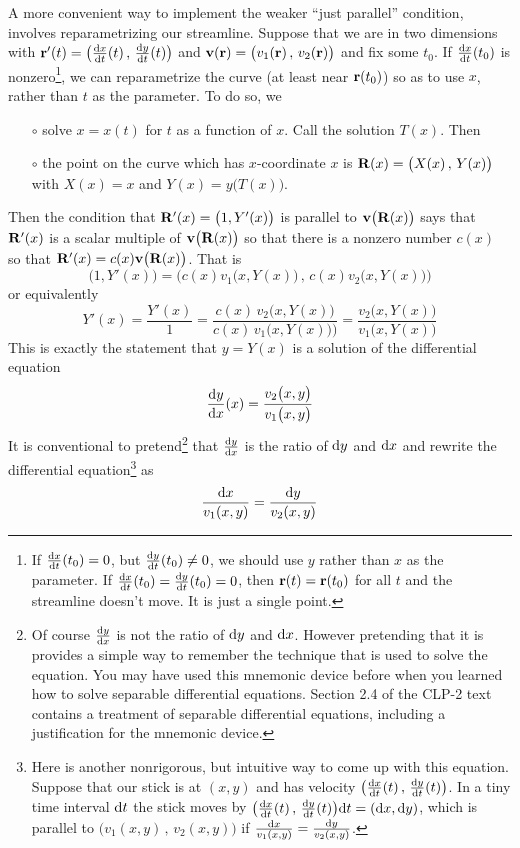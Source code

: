 A more convenient way to implement the weaker ``just parallel'' 
condition, involves reparametrizing our streamline. 
Suppose that we are in two dimensions 
with $\vr'(t)=\big(\diff{x}{t}(t)\,,\,\diff{y}{t}(t)\big)$ and
$\mathbf{v}(\mathbf{r})=\big(v_1(\mathbf{r})\,,\,v_2(\mathbf{r})\big)$  and fix some $t_0$. If $\diff{x}{t}(t_0)$ is 
nonzero\footnote{If $\diff{x}{t}(t_0)=0$,
but $\diff{y}{t}(t_0)\ne 0$, we should use $y$ rather than $x$ as the 
parameter. If $\diff{x}{t}(t_0)=\diff{y}{t}(t_0)=0$, then $\mathbf{r}(t)=\mathbf{r}(t_0)$
for all $t$ and the streamline doesn't move. It is just a single point.}, 
we can reparametrize the curve (at least near $\mathbf{r}(t_0)$) so as to use $x$, rather than $t$ as the parameter. To do so, we
\begin{itemize}\itemsep1pt \parskip0pt  %
\item[$\circ$] solve $x=x(t)$ for $t$ as a function of $x$. Call 
the solution $T(x)$. Then
\item[$\circ$] the point on the curve which has $x$-coordinate $x$ is 
$\mathbf{R}(x)=\big(X(x)\,,\,Y(x)\big)$ with $X(x)=x$ and $Y(x) = y\big(T(x)\big)$. 
\end{itemize}
Then the condition that $\mathbf{R}'(x)=\big(1,Y'(x)\big)$ is parallel to $\mathbf{v}\big(\mathbf{R}(x)\big)$ says that $\mathbf{R}'(x)$ is a scalar multiple of
$\mathbf{v}\big(\mathbf{R}(x)\big)$ so that 
there is a nonzero number $c(x)$ so that $\mathbf{R}'(x)=c(x) \mathbf{v}\big(\mathbf{R}(x)\big)$. That is
\begin{equation*}
\big(1,Y'(x)\big) 
   =\big( c(x)v_1\big(x,Y(x)\big)\,,\, c(x)v_2\big(x,Y(x)\big)  \big)
\end{equation*}
or equivalently
\begin{equation*}
Y'(x)=\frac{Y'(x)}{1}
=\frac{c(x)\,v_2\big(x,Y(x)\big)}{c(x)\,v_1\big(x,Y(x)\big)\big)}
=\frac{v_2\big(x,Y(x)\big)}{v_1\big(x,Y(x)\big)}
\end{equation*}
This is exactly the statement that $y=Y(x)$ is a solution of the differential equation
\begin{equation*}
\diff{y}{x}(x) = \frac{v_2\big(x,y\big)}{v_1\big(x,y\big)}
\end{equation*}
It is conventional to pretend\footnote{Of course $\diff{y}{x}$ is not the ratio of $\mathrm{d}y$ and $\mathrm{d}x$. However pretending that it is provides a simple
way to remember the technique that is used to solve the equation. You may have used this mnemonic device before when you learned how to solve separable differential equations. Section 2.4 of the CLP-2 text contains a treatment of separable differential equations, including a justification for the mnemonic device.} 
that $\diff{y}{x}$ is the ratio of $\mathrm{d}y$ and $\mathrm{d}x$ and rewrite the differential equation\footnote{Here is another nonrigorous, but intuitive way
to come up with this equation. Suppose that our stick is at $(x,y)$ 
and has velocity $\big(\diff{x}{t}(t)\,,\,\diff{y}{t}(t)\big)$. 
In a tiny time interval $\mathrm{d}t$ the stick moves by $\big(\diff{x}{t}(t)\,,\,\diff{y}{t}(t)\big)\dee{t}
=(\dee{x},\dee{y})$, which is parallel to  $\big(v_1(x,y)\,,\,v_2(x,y)\big)$
if $\frac{\mathrm{d}x}{v_1(x,y)}=\frac{\mathrm{d}y}{v_2(x,y)}$.} as
\begin{equation*}
\frac{\mathrm{d}x}{v_1(x,y)}=\frac{\mathrm{d}y}{v_2(x,y)}
\end{equation*}

